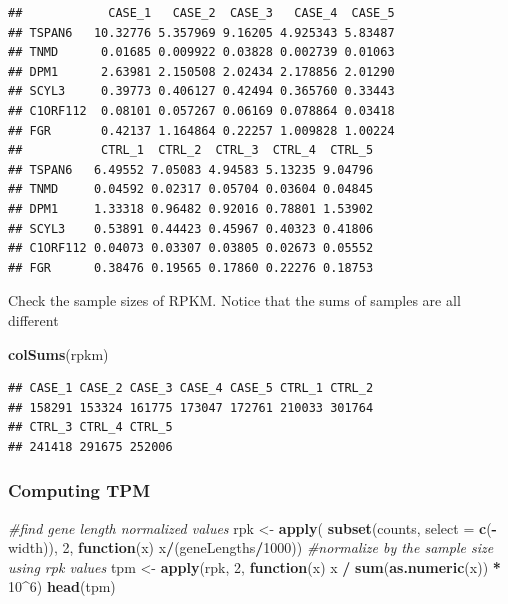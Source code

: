 \documentclass[12pt,]{krantz}
\newenvironment{Shaded}{\begin{snugshade}}{\end{snugshade}}
\newcommand{\CommentTok}[1]{\textcolor[rgb]{0.56,0.35,0.01}{\textit{#1}}}
\newcommand{\ControlFlowTok}[1]{\textcolor[rgb]{0.13,0.29,0.53}{\textbf{#1}}}
\newcommand{\DataTypeTok}[1]{\textcolor[rgb]{0.13,0.29,0.53}{#1}}
\newcommand{\DecValTok}[1]{\textcolor[rgb]{0.00,0.00,0.81}{#1}}
\newcommand{\KeywordTok}[1]{\textcolor[rgb]{0.13,0.29,0.53}{\textbf{#1}}}
\newcommand{\NormalTok}[1]{#1}
\newcommand{\OperatorTok}[1]{\textcolor[rgb]{0.81,0.36,0.00}{\textbf{#1}}}
\newcommand{\StringTok}[1]{\textcolor[rgb]{0.31,0.60,0.02}{#1}}
\begin{document}
\begin{verbatim}
##            CASE_1   CASE_2  CASE_3   CASE_4  CASE_5
## TSPAN6   10.32776 5.357969 9.16205 4.925343 5.83487
## TNMD      0.01685 0.009922 0.03828 0.002739 0.01063
## DPM1      2.63981 2.150508 2.02434 2.178856 2.01290
## SCYL3     0.39773 0.406127 0.42494 0.365760 0.33443
## C1ORF112  0.08101 0.057267 0.06169 0.078864 0.03418
## FGR       0.42137 1.164864 0.22257 1.009828 1.00224
##           CTRL_1  CTRL_2  CTRL_3  CTRL_4  CTRL_5
## TSPAN6   6.49552 7.05083 4.94583 5.13235 9.04796
## TNMD     0.04592 0.02317 0.05704 0.03604 0.04845
## DPM1     1.33318 0.96482 0.92016 0.78801 1.53902
## SCYL3    0.53891 0.44423 0.45967 0.40323 0.41806
## C1ORF112 0.04073 0.03307 0.03805 0.02673 0.05552
## FGR      0.38476 0.19565 0.17860 0.22276 0.18753
\end{verbatim}

Check the sample sizes of RPKM. Notice that the sums of samples are all different

\begin{Shaded}
\begin{Highlighting}[]
\KeywordTok{colSums}\NormalTok{(rpkm)}
\end{Highlighting}
\end{Shaded}

\begin{verbatim}
## CASE_1 CASE_2 CASE_3 CASE_4 CASE_5 CTRL_1 CTRL_2 
## 158291 153324 161775 173047 172761 210033 301764 
## CTRL_3 CTRL_4 CTRL_5 
## 241418 291675 252006
\end{verbatim}

\hypertarget{computing-tpm}{%
\subsubsection{Computing TPM}\label{computing-tpm}}

\begin{Shaded}
\begin{Highlighting}[]
\CommentTok{#find gene length normalized values }
\NormalTok{rpk <-}\StringTok{ }\KeywordTok{apply}\NormalTok{( }\KeywordTok{subset}\NormalTok{(counts, }\DataTypeTok{select =} \KeywordTok{c}\NormalTok{(}\OperatorTok{-}\NormalTok{width)), }\DecValTok{2}\NormalTok{, }
              \ControlFlowTok{function}\NormalTok{(x) x}\OperatorTok{/}\NormalTok{(geneLengths}\OperatorTok{/}\DecValTok{1000}\NormalTok{))}
\CommentTok{#normalize by the sample size using rpk values}
\NormalTok{tpm <-}\StringTok{ }\KeywordTok{apply}\NormalTok{(rpk, }\DecValTok{2}\NormalTok{, }\ControlFlowTok{function}\NormalTok{(x) x }\OperatorTok{/}\StringTok{ }\KeywordTok{sum}\NormalTok{(}\KeywordTok{as.numeric}\NormalTok{(x)) }\OperatorTok{*}\StringTok{ }\DecValTok{10}\OperatorTok{^}\DecValTok{6}\NormalTok{)}
\KeywordTok{head}\NormalTok{(tpm)}
\end{Highlighting}
\end{Shaded}
\end{document}
